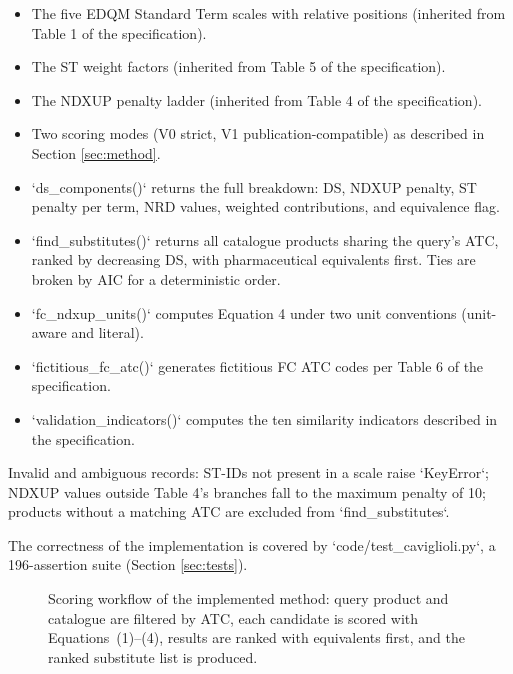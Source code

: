 \documentclass[12pt]{article}
\begin{document}
\begin{itemize}
\item The five EDQM Standard Term scales with relative positions (inherited from Table 1 of the specification).
\item The ST weight factors (inherited from Table 5 of the specification).
\item The NDXUP penalty ladder (inherited from Table 4 of the specification).
\item Two scoring modes (V0 strict, V1 publication-compatible) as described in Section \ref{sec:method}.
\item `ds\_components()` returns the full breakdown: DS, NDXUP penalty, ST penalty per term, NRD values, weighted contributions, and equivalence flag.
\item `find\_substitutes()` returns all catalogue products sharing the query's ATC, ranked by decreasing DS, with pharmaceutical equivalents first. Ties are broken by AIC for a deterministic order.
\item `fc\_ndxup\_units()` computes Equation 4 under two unit conventions (unit-aware and literal).
\item `fictitious\_fc\_atc()` generates fictitious FC ATC codes per Table 6 of the specification.
\item `validation\_indicators()` computes the ten similarity indicators described in the specification.
\end{itemize}

Invalid and ambiguous records: ST-IDs not present in a scale raise `KeyError`; NDXUP values outside Table 4's branches fall to the maximum penalty of 10; products without a matching ATC are excluded from `find\_substitutes`.

The correctness of the implementation is covered by `code/test\_caviglioli.py`, a 196-assertion suite (Section \ref{sec:tests}).

\begin{figure}[htbp]
\centering
\resizebox{\textwidth}{!}{%
%
}
\caption{Scoring workflow of the implemented method: query product and catalogue are filtered by ATC, each candidate is scored with Equations~(1)--(4), results are ranked with equivalents first, and the ranked substitute list is produced.}
\label{fig:workflow}
\end{figure}

\end{document}
